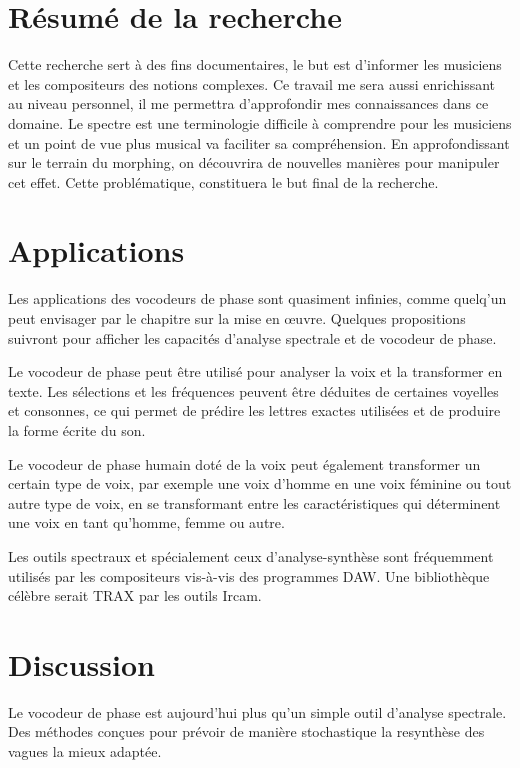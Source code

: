 \label{ch:conclusions}

\section{Résumé de la recherche}

Cette recherche sert à des fins documentaires, le but est d'informer les musiciens et les compositeurs des notions complexes. Ce travail me sera aussi enrichissant au niveau personnel, il me permettra d'approfondir mes connaissances dans ce domaine. Le spectre est une terminologie difficile à comprendre pour les musiciens et un point de vue plus musical va faciliter sa compréhension. En approfondissant sur le terrain du morphing, on découvrira de nouvelles manières pour manipuler cet effet. Cette problématique, constituera le but final de la recherche. 

\section{Applications}

Les applications des vocodeurs de phase sont quasiment infinies, comme quelq’un peut envisager par le chapitre sur la mise en œuvre. Quelques propositions suivront pour afficher les capacités d'analyse spectrale et de vocodeur de phase.

Le vocodeur de phase peut être utilisé pour analyser la voix et la transformer en texte. Les sélections et les fréquences peuvent être déduites de certaines voyelles et consonnes, ce qui permet de prédire les lettres exactes utilisées et de produire la forme écrite du son.

Le vocodeur de phase humain doté de la voix peut également transformer un certain type de voix, par exemple une voix d'homme en une voix féminine ou tout autre type de voix, en se transformant entre les caractéristiques qui déterminent une voix en tant qu'homme, femme ou autre.

Les outils spectraux et spécialement ceux d'analyse-synthèse sont fréquemment utilisés par les compositeurs vis-à-vis des programmes DAW. Une bibliothèque célèbre serait TRAX par les outils Ircam.


\section{Discussion}

Le vocodeur de phase est aujourd'hui plus qu'un simple outil d'analyse spectrale. Des méthodes conçues pour prévoir de manière stochastique la resynthèse des vagues la mieux adaptée.

